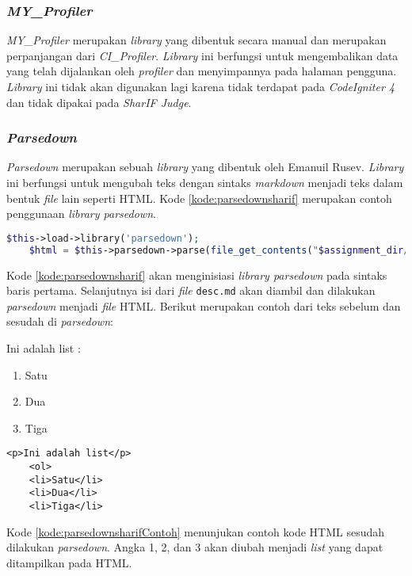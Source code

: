 \subsubsection{\textit{MY\_Profiler}}
\textit{MY\_Profiler} merupakan \textit{library} yang dibentuk secara manual dan merupakan perpanjangan dari \textit{CI\_Profiler}. \textit{Library} ini berfungsi untuk mengembalikan data yang telah dijalankan oleh \textit{profiler} dan menyimpannya pada halaman pengguna. \textit{Library} ini tidak akan digunakan lagi karena tidak terdapat pada \textit{CodeIgniter 4} dan tidak dipakai pada \textit{SharIF Judge}.

\subsubsection{\textit{Parsedown}}
\textit{Parsedown} merupakan sebuah \textit{library} yang dibentuk oleh Emanuil Rusev. \textit{Library} ini berfungsi untuk mengubah teks dengan sintaks \textit{markdown} menjadi teks dalam bentuk \textit{file} lain seperti HTML. Kode \ref{kode:parsedownsharif} merupakan contoh penggunaan \textit{library parsedown}.

\begin{lstlisting}[language=PHP, caption=Contoh kode penggunaan \textit{Library Parsedown}, label=kode:parsedownsharif]
	$this->load->library('parsedown');
	$html = $this->parsedown->parse(file_get_contents("$assignment_dir/p$i/desc.md"));
\end{lstlisting}

Kode \ref{kode:parsedownsharif} akan menginisiasi \textit{library parsedown} pada sintaks baris pertama. Selanjutnya isi dari \textit{file} \texttt{desc.md} akan diambil dan dilakukan \textit{parsedown} menjadi \textit{file} HTML. Berikut merupakan contoh dari teks sebelum dan sesudah di \textit{parsedown}:

Ini adalah list :
\begin{enumerate}
	\item Satu
	\item Dua
	\item Tiga
\end{enumerate}

\begin{lstlisting}[caption=Contoh hasil teks sesudah dilakukan \textit{parsedown}, label=kode:parsedownsharifContoh]
	<p>Ini adalah list</p>
	<ol>
	<li>Satu</li>
	<li>Dua</li>
	<li>Tiga</li>
\end{lstlisting}

Kode \ref{kode:parsedownsharifContoh} menunjukan contoh kode HTML sesudah dilakukan \textit{parsedown}. Angka 1, 2, dan 3 akan diubah menjadi \textit{list} yang dapat ditampilkan pada HTML.

